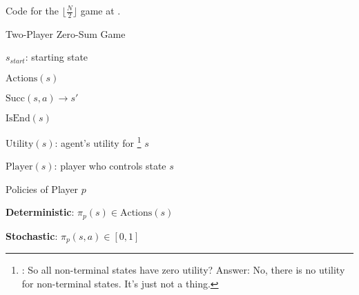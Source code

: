 \documentclass[11pt]{article}
\begin{document}


Code for the $\lfloor \tfrac{N}{2} \rfloor$ game at . 

\begin{itemdefinition}{Two-Player Zero-Sum Game}
		\item $s_{start}$: starting state
		\item $\text{Actions}(s)$
		\item $\text{Succ}(s, a) \rightarrow s'$
		\item $\text{IsEnd}(s)$
		\item $\text{Utility}(s)$: agent's utility for \footnote{: So all non-terminal states have zero utility? Answer: No, there is no utility for non-terminal states. It's just not a thing.} $s$
		\item $\text{Player}(s)$: player who controls state $s$
\end{itemdefinition}

\begin{itemdefinition}{Policies of Player $p$}
	\item \textbf{Deterministic}: $\pi_p(s) \in \text{Actions}(s)$
	\item \textbf{Stochastic}: $\pi_p(s, a) \in [0, 1]$
\end{itemdefinition}
\end{document}
